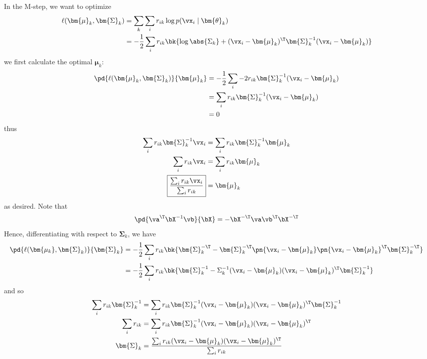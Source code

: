 \documentclass[189]{pset}
\begin{document}
    In the M-step, we want to optimize
    \begin{align*}
      \ell(\bm{\mu}_k, \bm{\Sigma}_k )
      &= \sum_k \sum_i r_{ik} \log p(\vx_i \mid \bm{\theta}_k) \\
      &= -\frac{1}{2} \sum_i r_{ik} \bk{\log \abs{\Sigma_k} + (\vx_i -
        \bm{\mu}_k)^\T \bm{\Sigma}_k^{-1} (\vx_i - \bm{\mu}_k)}
    \end{align*}
    we first calculate the optimal $\bm{\mu}_k$:
    \begin{align*}
      \pd{\ell(\bm{\mu}_k, \bm{\Sigma}_k)}{\bm{\mu}_k}
      &= -\frac{1}{2} \sum_i -2r_{ik} \bm{\Sigma}_k^{-1} (\vx_i -
        \bm{\mu}_k) \\
      &= \sum_i r_{ik} \bm{\Sigma}_k^{-1} (\vx_i - \bm{\mu}_k) \\
      &= 0
    \end{align*}
    thus
    \begin{align*}
      \sum_i r_{ik} \bm{\Sigma}_k^{-1} \vx_i
      &= \sum_i r_{ik} \bm{\Sigma}_k^{-1} \bm{\mu}_k \\
      \sum_i r_{ik} \vx_i
      &= \sum_i r_{ik} \bm{\mu}_k \\
      \boxed{\frac{\sum_i r_{ik} \vx_i}{\sum_i r_{ik}}}
      &= \bm{\mu}_k
    \end{align*}
    as desired. Note that
    \[
      \pd{\va^\T \bX^{-1}\vb}{\bX} = -\bX^{-\T} \va \vb^\T \bX^{-\T}
    \]
    Hence, differentiating with respect to $\bm{\Sigma}_k$, we have
    \begin{align*}
      \pd{\ell(\bm{\mu_k}, \bm{\Sigma}_k)}{\bm{\Sigma}_k}
      &= -\frac{1}{2} \sum_i r_{ik} \bk{\bm{\Sigma}_k^{-\T}
        -\bm{\Sigma}_k^{-\T} \pn{\vx_i - \bm{\mu}_k} \pn{\vx_i -
        \bm{\mu}_k}^{\T} \bm{\Sigma}_k^{-\T}} \\
      &= -\frac{1}{2} \sum_i r_{ik} \bk{\bm{\Sigma}_k^{-1} -
        \Sigma^{-1}_k (\vx_i - \bm{\mu}_k)(\vx_i - \bm{\mu}_k)^{\T}
        \bm{\Sigma}_k^{-1}}
    \end{align*}
    and so
    \begin{align*}
      \sum_i r_{ik} \bm{\Sigma}_k^{-1}
      &= \sum_i r_{ik} \bm{\Sigma}_k^{-1} (\vx_i - \bm{\mu}_k)(\vx_i -
        \bm{\mu}_k)^{\T} \bm{\Sigma}_k^{-1} \\
      \sum_i r_{ik}
      &= \sum_i r_{ik} \bm{\Sigma}_k^{-1} (\vx_i - \bm{\mu}_k)(\vx_i -
        \bm{\mu}_k)^{\T} \\
      \bm{\Sigma}_k
      &= \frac{\sum_i r_{ik} (\vx_i - \bm{\mu}_k)(\vx_i -
        \bm{\mu}_k)^{\T}}{\sum_i r_{ik}}
    \end{align*}
  \clearpage
\end{document}
